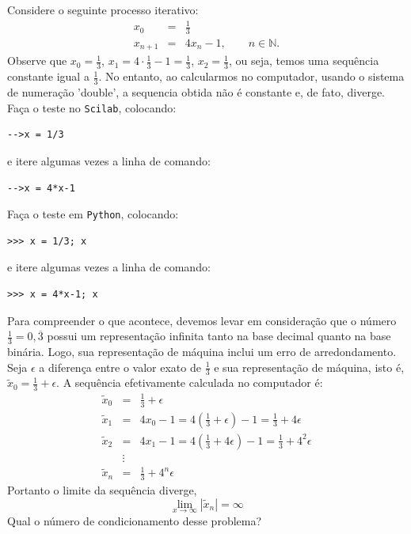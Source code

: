 \begin{ex} Considere o seguinte processo iterativo:
  \begin{eqnarray*}
    x_0 &=& \frac{1}{3}\\
    x_{n+1} &=& 4x_n-1,\qquad n\in\mathbb{N}.
  \end{eqnarray*}
Observe que $x_0=\frac{1}{3}$, $x_1=4\cdot \frac{1}{3}-1=\frac{1}{3}$, $x_2=\frac{1}{3}$, ou seja, temos uma sequência constante igual a $\frac{1}{3}$. No entanto, ao calcularmos no computador, usando o sistema de numeração 'double', a sequencia obtida não é constante e, de fato, diverge.
\ifisscilab
Faça o teste no \verb+Scilab+, colocando:
\begin{verbatim}
-->x = 1/3
\end{verbatim}
e itere algumas vezes a linha de comando:
\begin{verbatim}
-->x = 4*x-1
\end{verbatim}
\fi
\ifispython
Faça o teste em \verb+Python+, colocando:
\begin{verbatim}
>>> x = 1/3; x
\end{verbatim}
e itere algumas vezes a linha de comando:
\begin{verbatim}
>>> x = 4*x-1; x
\end{verbatim}
\fi

Para compreender o que acontece, devemos levar em consideração que o número $\frac{1}{3}=0,\overline{3}$ possui um representação infinita tanto na base decimal quanto na base binária. Logo, sua representação de máquina inclui um erro de arredondamento. Seja $\epsilon$ a diferença entre o valor exato de $\frac{1}{3}$ e sua representação de máquina, isto é, $\tilde{x}_0=\frac{1}{3}+\epsilon$. A sequência efetivamente calculada no computador é:
\begin{eqnarray*}
\tilde{x}_0&=&\frac{1}{3}+\epsilon\\
\tilde{x}_1&=&4x_0-1=4\left(\frac{1}{3}+\epsilon\right)-1=\frac{1}{3}+4\epsilon\\
\tilde{x}_2&=&4x_1-1=4\left(\frac{1}{3}+4\epsilon\right)-1=\frac{1}{3}+4^2\epsilon\\
&\vdots&\\
\tilde{x}_n&=&\frac{1}{3}+4^n\epsilon
\end{eqnarray*}
Portanto o limite da sequência diverge,
\begin{equation*}
\lim_{x\to\infty}|\tilde{x}_n|=\infty  
\end{equation*}
Qual o número de condicionamento desse problema?
\end{ex}


